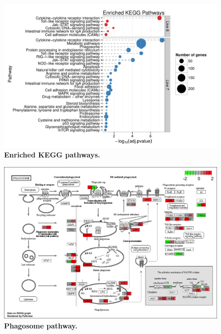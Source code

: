 \documentclass[10pt]{article}
\begin{document}
\begin{figure}[!ht]
    \begin{center}
        \includegraphics[width=7in]{line67_KEGG_cleveland.pdf}
    \end{center}
    \caption{
        {\bf Enriched KEGG pathways.}
    }
    \label{line67_kegg}
\end{figure}

\begin{figure}[!ht]
    \begin{center}
        \includegraphics[width=6in]{gga04145_degenes_multi.png}
    \end{center}
    \caption{
        {\bf Phagosome pathway.}
    }
    \label{kegg_phagosome}
\end{figure}
\end{document}
